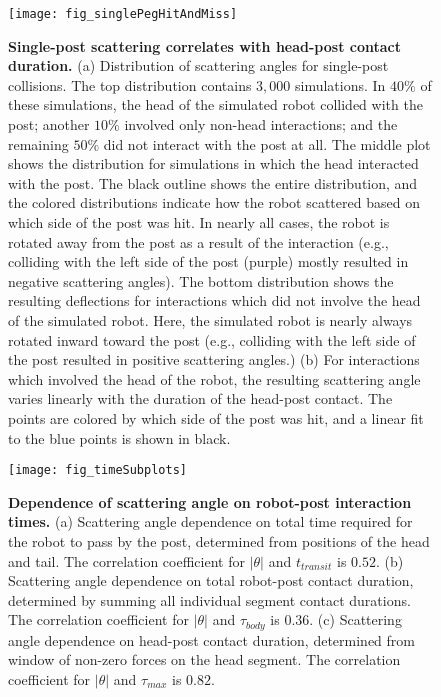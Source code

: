 \documentclass[aps,pre,twocolumn,superscriptaddress]{revtex4-1}
\begin{document}
\begin{figure}[ht!]
	\texttt{[image: fig\_singlePegHitAndMiss]}
	\caption{\textbf{Single-post scattering correlates with head-post contact duration.} (a) Distribution of scattering angles for single-post collisions. The top distribution contains $3,000$ simulations.  In $40\%$ of these simulations, the head of the simulated robot collided with the post; another $10\%$ involved only non-head interactions; and the remaining $50\%$ did not interact with the post at all.  The middle plot shows the distribution for simulations in which the head interacted with the post.  The black outline shows the entire distribution, and the colored distributions indicate how the robot scattered based on which side of the post was hit.  In nearly all cases, the robot is rotated away from the post as a result of the interaction (e.g., colliding with the left side of the post (purple) mostly resulted in negative scattering angles). The bottom distribution shows the resulting deflections for interactions which did not involve the head of the simulated robot. Here, the simulated robot is nearly always rotated inward toward the post (e.g., colliding with the left side of the post resulted in positive scattering angles.) (b) For interactions which involved the head of the robot, the resulting scattering angle varies linearly with the duration of the head-post contact. The points are colored by which side of the post was hit, and a linear fit to the blue points is shown in black.}%
	\label{fig:singlepegpdfs}
\end{figure}

\begin{figure}[ht!]
	\texttt{[image: fig\_timeSubplots]}
	\caption{\textbf{Dependence of scattering angle on robot-post interaction times.} (a) Scattering angle dependence on total time required for the robot to pass by the post, determined from positions of the head and tail. The correlation coefficient for $|\theta|$ and $t_{transit}$  is $0.52$. (b) Scattering angle dependence on total robot-post contact duration, determined by summing all individual segment contact durations. The correlation coefficient for $|\theta|$ and $\tau_{body}$  is $0.36$. (c) Scattering angle dependence on head-post contact duration, determined from window of non-zero forces on the head segment. The correlation coefficient for $|\theta|$ and $\tau_{max}$  is $0.82$.%
	 }
	\label{fig:times}
\end{figure}
\end{document}
